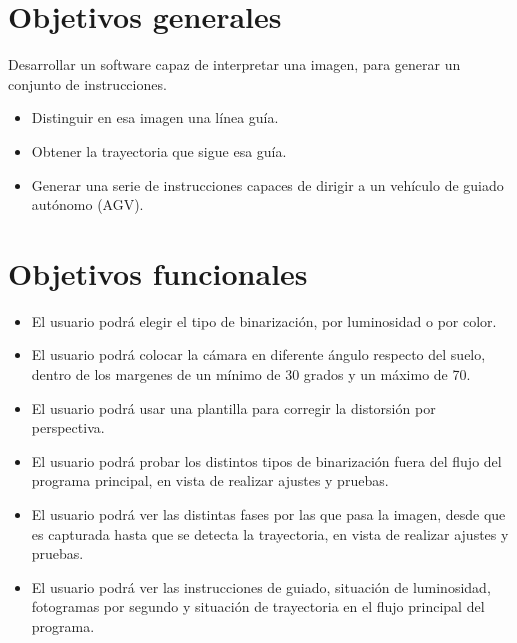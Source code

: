
\section{Objetivos generales}
Desarrollar un software capaz de interpretar una imagen, para generar un conjunto de instrucciones.

\begin{itemize}
	\item Distinguir en esa imagen una línea guía.
	
	\item Obtener la trayectoria que sigue esa guía.
	
	\item Generar una serie de instrucciones capaces de dirigir a un vehículo de guiado autónomo (AGV).
\end{itemize} 

\section{Objetivos funcionales}
\begin{itemize}
	\item El usuario podrá elegir el tipo de binarización, por luminosidad o por color.
	
	\item El usuario podrá colocar la cámara en diferente ángulo respecto del suelo, dentro de los margenes de un mínimo de 30 grados y un máximo de 70.
	
	\item El usuario podrá usar una plantilla para corregir la distorsión por perspectiva.
	
	\item El usuario podrá probar los distintos tipos de binarización fuera del flujo del programa principal, en vista de realizar ajustes y pruebas.
	
	\item El usuario podrá ver las distintas fases por las que pasa la imagen, desde que es capturada hasta que se detecta la trayectoria, en vista de realizar ajustes y pruebas.
	
	\item El usuario podrá ver las instrucciones de guiado, situación de luminosidad, fotogramas por segundo y situación de trayectoria en el flujo principal del programa.
	
\end{itemize}


